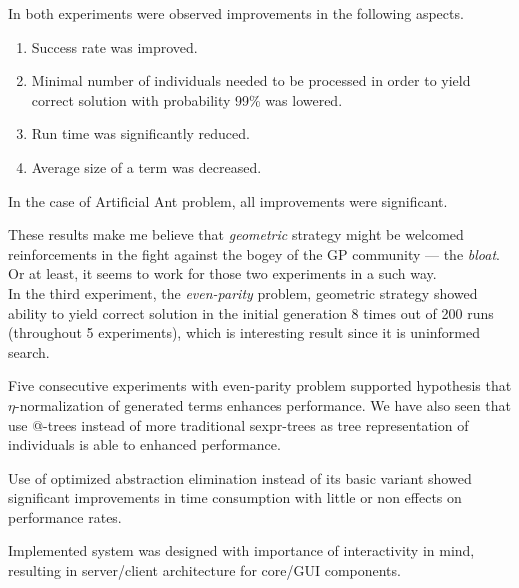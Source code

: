 \documentclass[conference]{IEEEtran}
\makeatletter
\newcommand{\atTree}{@-tree\xspace}
\newcommand{\sexprTree}{sexpr-tree\xspace}
\makeatother
\begin{document}
In both experiments were observed improvements in the following aspects.

\begin{enumerate}
 \item Success rate was improved.
 \item Minimal number of individuals needed to be processed in order to yield 
       correct solution with probability 99\% was lowered.
 \item Run time was significantly reduced. 
 \item Average size of a term was decreased.
\end{enumerate}

In the case of Artificial Ant problem, all improvements were significant.

These results make me believe that \textit{geometric} strategy might
be welcomed reinforcements in the fight against the bogey of 
the GP community --- the \textit{bloat}.
Or at least, it seems to work for those two experiments in a such way.\\


In the third experiment, the \textit{even-parity} problem, geometric strategy 
showed ability to yield correct solution in the initial generation
8 times out of 200 runs (throughout 5 experiments), which is interesting
result since it is uninformed search. 

Five consecutive experiments with even-parity problem supported 
hypothesis that $\eta$-normalization of generated terms enhances performance.
We have also seen that use \atTree{}s instead of more traditional \sexprTree{}s
as tree representation of individuals is able to enhanced performance.

Use of optimized abstraction elimination instead of its basic variant 
showed significant improvements in time consumption with little or 
non effects on performance rates.

Implemented system was designed with importance of interactivity in mind,
resulting in server/client architecture for core/GUI components.
\end{document}
